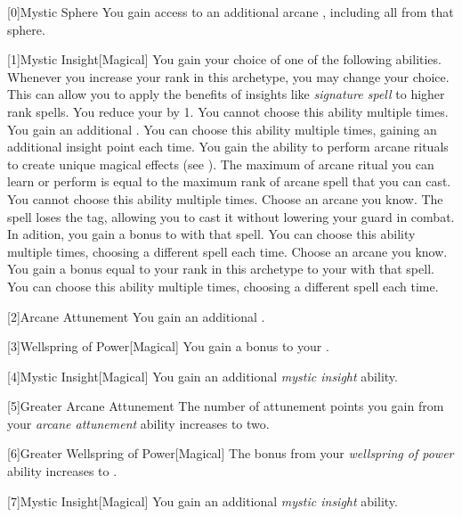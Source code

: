         [0]{Mystic Sphere} You gain access to an additional arcane , including all  from that sphere.

        [1]{Mystic Insight}[Magical]
        You gain your choice of one of the following abilities.
        Whenever you increase your rank in this archetype, you may change your choice.
        This can allow you to apply the benefits of insights like \textit{signature spell} to higher rank spells.
        {
             You reduce your  by 1.
                You cannot choose this ability multiple times.
             You gain an additional .
                You can choose this ability multiple times, gaining an additional insight point each time.
             You gain the ability to perform arcane rituals to create unique magical effects (see ).
                The maximum  of arcane ritual you can learn or perform is equal to the maximum rank of arcane spell that you can cast.
                You cannot choose this ability multiple times.
             Choose an arcane  you know.
                The spell loses the  tag, allowing you to cast it without lowering your guard in combat.
                In adition, you gain a  bonus to  with that spell.
                You can choose this ability multiple times, choosing a different spell each time.
             Choose an arcane  you know.
                You gain a bonus equal to your rank in this archetype to your  with that spell.
                You can choose this ability multiple times, choosing a different spell each time.
        }

        [2]{Arcane Attunement} You gain an additional .

        [3]{Wellspring of Power}[Magical]
        You gain a  bonus to your  .

        [4]{Mystic Insight}[Magical]
        You gain an additional \textit{mystic insight} ability.

        [5]{Greater Arcane Attunement} The number of attunement points you gain from your \textit{arcane attunement} ability increases to two.

        [6]{Greater Wellspring of Power}[Magical]
        The bonus from your \textit{wellspring of power} ability increases to .

        [7]{Mystic Insight}[Magical]
        You gain an additional \textit{mystic insight} ability.
